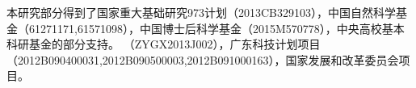 \begin{thanksfor}
本研究部分得到了国家重大基础研究973计划（2013CB329103），中国自然科学基金（61271171,61571098），中国博士后科学基金（2015M570778），中央高校基本科研基金的部分支持。 （ZYGX2013J002），广东科技计划项目（2012B090400031,2012B090500003,2012B091000163），国家发展和改革委员会项目。
\end{thanksfor}